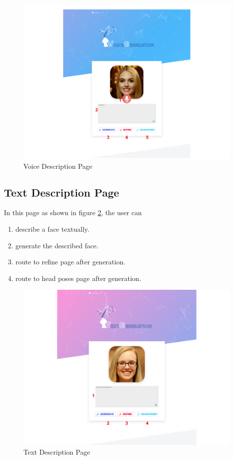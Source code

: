 \begin{figure}[H]
    \centering
    \includegraphics[width=1.0\textwidth]{images/guide/voice.png}
    \caption{Voice Description Page}
    \label{fig:user-voice}
\end{figure}


\subsection{Text Description Page}
In this page as shown in figure \ref{fig:user-text}, the user can 

\begin{enumerate}
    \item describe a face textually.
    \item generate the described face.
    \item route to refine page after generation.
    \item route to head poses page after generation.
\end{enumerate}

\begin{figure}[H]
    \centering
    \includegraphics[width=1.0\textwidth]{images/guide/text.png}
    \caption{Text Description Page}
    \label{fig:user-text}
\end{figure}


